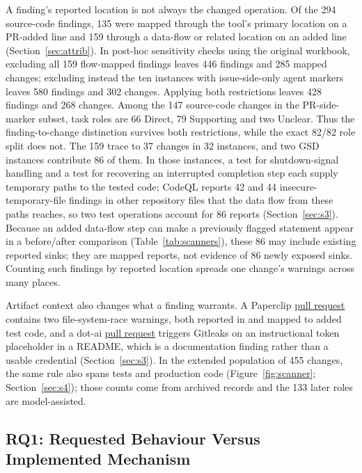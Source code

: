 \documentclass[acmsmall,screen,nonacm]{acmart}
\begin{document}
A finding's reported location is not always the changed operation. Of the 294 source-code findings, 135 were mapped through the tool's primary location on a PR-added line and 159 through a data-flow or related location on an added line (Section~\ref{sec:attrib}). In post-hoc sensitivity checks using the original workbook, excluding all 159 flow-mapped findings leaves 446 findings and 285 mapped changes; excluding instead the ten instances with issue-side-only agent markers leaves 580 findings and 302 changes. Applying both restrictions leaves 428 findings and 268 changes. Among the 147 source-code changes in the PR-side-marker subset, task roles are 66 Direct, 79 Supporting and two Unclear. Thus the finding-to-change distinction survives both restrictions, while the exact 82/82 role split does not. The 159 trace to 37 changes in 32 instances, and two GSD instances contribute 86 of them. In those instances, a test for shutdown-signal handling and a test for recovering an interrupted completion step each supply temporary paths to the tested code; CodeQL reports 42 and 44 insecure-temporary-file findings in other repository files that the data flow from these paths reaches, so two test operations account for 86 reports (Section~\ref{sec:s3}). Because an added data-flow step can make a previously flagged statement appear in a before/after comparison (Table~\ref{tab:scanners}), these 86 may include existing reported sinks; they are mapped reports, not evidence of 86 newly exposed sinks. Counting such findings by reported location spreads one change's warnings across many places.

Artifact context also changes what a finding warrants. A Paperclip \href{https://github.com/paperclipai/paperclip/pull/5240}{pull request} contains two file-system-race warnings, both reported in and mapped to added test code, and a dot-ai \href{https://github.com/vfarcic/dot-ai/pull/286}{pull request} triggers Gitleaks on an instructional token placeholder in a README, which is a documentation finding rather than a usable credential (Section~\ref{sec:s3}). In the extended population of 455 changes, the same rule also spans tests and production code (Figure~\ref{fig:scanner}; Section~\ref{sec:s4}); those counts come from archived records and the 133 later roles are model-assisted.

\subsection{RQ1: Requested Behaviour Versus Implemented Mechanism}\label{sec:rq1-open}
\end{document}
